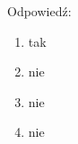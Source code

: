 Odpowiedź:
\begin{enumerate}
    \item tak
    \item nie
    \item nie
    \item nie
\end{enumerate}